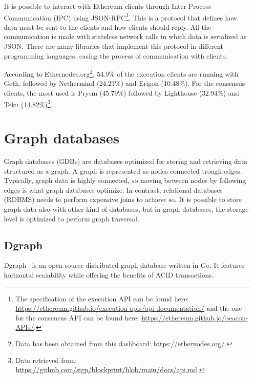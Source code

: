 It is possible to interact with Ethereum clients through Inter-Process Communication (IPC) using JSON-RPC\footnote{The specification of the execution API can be found here: \url{https://ethereum.github.io/execution-apis/api-documentation/} and the one for the consensus API can be found here: \url{https://ethereum.github.io/beacon-APIs/}.}. This is a protocol that defines how data must be sent to the clients and how clients should reply. All the communication is made with stateless network calls in which data is serialized as JSON. There are many libraries that implement this protocol in different programming languages, easing the process of communication with clients.

According to Ethernodes.org\footnote{Data has been obtained from this dashboard: \url{https://ethernodes.org/}.}, 54.9\% of the execution clients are running with Geth, followed by Nethermind (24.21\%) and Erigon (10.48\%). For the consensus clients, the most used is Prysm (45.79\%) followed by Lighthouse (32.94\%) and Teku (14.82\%)\footnote{Data retrieved from: \url{https://github.com/sigp/blockprint/blob/main/docs/api.md}.}.

\section{Graph databases}

Graph databases (GDBs) are databases optimized for storing and retrieving data structured as a graph. A graph is represented as nodes connected trough edges. Typically, graph data is highly connected, so moving between nodes by following edges is what graph databases optimize. In contrast, relational databases (RDBMS) needs to perform expensive joins to achieve so. It is possible to store graph data also with other kind of databases, but in graph databases, the storage level is optimized to perform graph traversal. 

\subsection{Dgraph}

Dgraph~\cite{dgraph} is an open-source distributed graph database written in Go. It features horizontal scalability while offering the benefits of ACID transactions.

